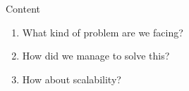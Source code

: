 \begin{frame}{Content}

\begin{enumerate}
    \item<1-> What kind of problem are we facing?
    \item<2-> How did we manage to solve this?
    \item<3-> How about scalability?
\end{enumerate}

\end{frame}
